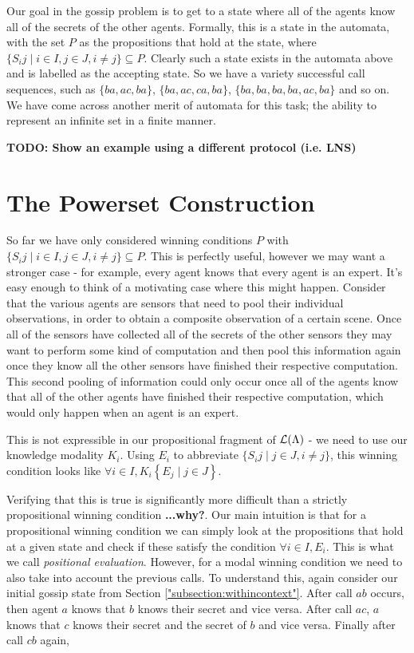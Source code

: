 \documentclass[12pt, a4paper]{article} %
\begin{document}
Our goal in the gossip problem is to get to a state where all of the agents know all of the secrets of the other agents. Formally, this is a state in the  automata, with the set $P$ as the propositions that hold at the state, where $\{S_i j \mid i \in I, j \in J, i \neq j\} \subseteq P$. Clearly such a state exists in the automata above and is labelled as the accepting state. So we have a variety successful call sequences, such as $\{ba, ac, ba\}$, $\{ba, ac, ca, ba\}$, $\{ba, ba, ba, ba, ac, ba\}$ and so on. We have come across another merit of automata for this task; the ability to represent an infinite set in a finite manner.

\textbf{TODO: Show an example using a different protocol (i.e. LNS)}

\section{The Powerset Construction}

So far we have only considered winning conditions $P$ with $\{S_i j \mid i \in I, j \in J, i \neq j\} \subseteq P$. This is perfectly useful, however we may want a stronger case - for example, every agent knows that every agent is an expert. It's easy enough to think of a motivating case where this might happen. Consider that the various agents are sensors that need to pool their individual observations, in order to obtain a composite observation of a certain scene. Once all of the sensors have collected all of the secrets of the other sensors they may want to perform some kind of computation and then pool this information again once they know all the other sensors have finished their respective computation. This second pooling of information could only occur once all of the agents know that all of the other agents have finished their respective computation, which would only happen when an agent is an expert. %

This is not expressible in our propositional fragment of $\mathcal{L}(\Lambda)$ - we need to use our knowledge modality $K_i$. Using $E_i$ to abbreviate $\{S_i j \mid j \in J, i \neq j\}$, this winning condition looks like $\forall i \in I, K_i \left\{E_j \mid j \in J\right\}$. 

Verifying that this is true is significantly more difficult than a strictly propositional winning condition \textbf{...why?}. Our main intuition is that for a propositional winning condition we can simply look at the propositions that hold at a given state and check if these satisfy the condition $\forall i \in I, E_i$. This is what we call \textit{positional evaluation}. However, for a modal winning condition we need to also take into account the previous calls. To understand this, again consider our initial gossip state from Section \ref{"subsection:withincontext"}. After call $ab$ occurs, then agent $a$ knows that $b$ knows their secret and vice versa. After call $ac$, $a$ knows that $c$ knows their secret and the secret of $b$ and vice versa. Finally after call $cb$ again, 
\end{document}
